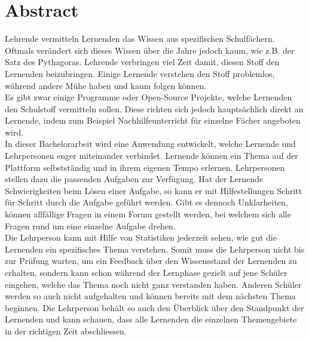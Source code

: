 \afterpage{\blankpage}
\section*{Abstract}

Lehrende vermitteln Lernenden das Wissen aus spezifischen Schulfächern. Oftmals verändert sich dieses Wissen über die Jahre jedoch kaum, wie z.B. der Satz des Pythagoras. Lehrende verbringen viel Zeit damit, diesen Stoff den Lernenden beizubringen. Einige Lernende verstehen den Stoff problemlos, während andere Mühe haben und kaum folgen können. \\

Es gibt zwar einige Programme oder Open-Source Projekte, welche Lernenden den Schulstoff vermitteln sollen. Diese richten sich jedoch hauptsächlich direkt an Lernende, indem zum Beispiel Nachhilfeunterricht für einzelne Fächer angeboten wird.\\

In dieser Bachelorarbeit wird eine Anwendung entwickelt, welche Lernende und Lehrpersonen enger miteinander verbindet. Lernende können ein Thema auf der Plattform selbstständig und in ihrem eigenen Tempo erlernen. Lehrpersonen stellen dazu die passenden Aufgaben zur Verfügung. Hat der Lernende Schwierigkeiten beim Lösen einer Aufgabe, so kann er mit Hilfestellungen Schritt für Schritt durch die Aufgabe geführt werden. Gibt es dennoch Unklarheiten, können allfällige Fragen in einem Forum gestellt werden, bei welchem sich alle Fragen rund um eine einzelne Aufgabe drehen. \\

Die Lehrperson kann mit Hilfe von Statistiken jederzeit sehen, wie gut die Lernenden ein spezifisches Thema verstehen. Somit muss die Lehrperson nicht bis zur Prüfung warten, um ein Feedback über den Wissensstand der Lernenden zu erhalten, sondern kann schon während der Lernphase gezielt auf jene Schüler eingehen, welche das Thema noch nicht ganz verstanden haben. Anderen Schüler werden so auch nicht aufgehalten und können bereits mit dem nächsten Thema beginnen. Die Lehrperson behält so auch den Überblick über den Standpunkt der Lernenden und kann schauen, dass alle Lernenden die einzelnen Themengebiete in der richtigen Zeit abschliessen.


\newpage
